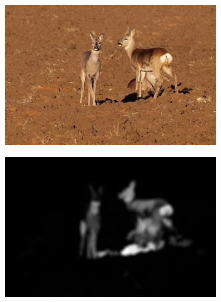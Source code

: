 \begin{figure}[H]
    \centering
    \begin{subfigure}{0.49\textwidth}
      \centering
      \includegraphics[scale=1.0]{obrazky/ORIGsrnky.jpg}
      \caption{}
    \end{subfigure}
    \begin{subfigure}{0.49\textwidth}
      \centering
      \includegraphics[scale=1.0]{obrazky/MargolinSMsrnky.jpg}
      \caption{}
    \end{subfigure}
    \vspace{4pt}
    

\end{figure}
